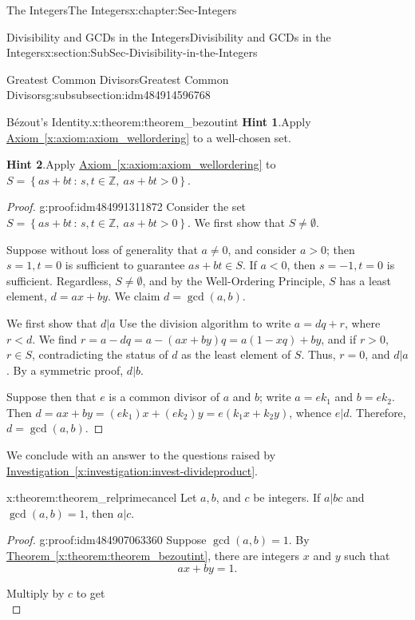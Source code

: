 \documentclass[oneside,10pt,]{book}
\newcommand{\blocktitlefont}{\relax}
\newcommand{\xreffont}{\relax}
\numberwithin{equation}{section}
\newcommand{\setof}[2]{{\left\{#1\,\colon\,#2\right\}}}
\def\Z{{\mathbb Z}}
\newcommand{\lt}{<}
\newcommand{\gt}{>}
\begin{document}
\begin{chapterptx}{The Integers}{}{The Integers}{}{}{x:chapter:Sec-Integers}
\begin{sectionptx}{Divisibility and GCDs in the Integers}{}{Divisibility and GCDs in the Integers}{}{}{x:section:SubSec-Divisibility-in-the-Integers}
\begin{subsubsectionptx}{Greatest Common Divisors}{}{Greatest Common Divisors}{}{}{g:subsubsection:idm484914596768}
\begin{theorem}{Bézout's Identity.}{}{x:theorem:theorem_bezoutint}
\textbf{\blocktitlefont Hint 1}.\quad{}Apply \hyperref[x:axiom:axiom_wellordering]{Axiom~{\xreffont\ref{x:axiom:axiom_wellordering}}} to a well-chosen set.%
\par\smallskip%
\noindent
\textbf{\blocktitlefont Hint 2}.\quad{}Apply \hyperref[x:axiom:axiom_wellordering]{Axiom~{\xreffont\ref{x:axiom:axiom_wellordering}}} to \(S = \setof{as+bt}{s,t\in\Z, \ as+bt \gt 0}\).%
\end{theorem}
\begin{proof}{}{g:proof:idm484991311872}
Consider the set \(S = \setof{as+bt}{s,t\in\Z, \ as+bt \gt 0}\). We first show that \(S\ne \emptyset\).%
\par
Suppose without loss of generality that \(a\ne 0\), and consider \(a \gt 0\); then \(s=1, t = 0\) is sufficient to guarantee \(as+bt\in S\). If \(a \lt 0\), then \(s = -1, t= 0\) is sufficient. Regardless, \(S\ne \emptyset\), and by the Well-Ordering Principle, \(S\) has a least element, \(d = ax+by\). We claim \(d = \gcd(a,b)\).%
\par
We first show that \(d|a\) Use the division algorithm to write \(a = dq + r\), where \(r \lt d\). We find \(r = a - dq = a - (ax+by)q = a(1-xq) + by\), and if \(r\gt 0\), \(r\in S\), contradicting the status of \(d\) as the least element of \(S\). Thus, \(r = 0\), and \(d|a\). By a symmetric proof, \(d|b\).%
\par
Suppose then that \(e\) is a common divisor of \(a\) and \(b\); write \(a = e k_1\) and \(b = e k_2\). Then \(d = ax + by = (ek_1)x + (ek_2)y = e(k_1x + k_2 y)\), whence \(e|d\). Therefore, \(d = \gcd(a,b)\).%
\end{proof}
We conclude with an answer to the questions raised by \hyperref[x:investigation:invest-divideproduct]{Investigation~{\xreffont\ref{x:investigation:invest-divideproduct}}}.%
\begin{theorem}{}{}{x:theorem:theorem_relprimecancel}%
Let \(a, b\), and \(c\) be integers. If \(a|bc\) and \(\gcd(a,b) = 1\), then \(a|c\).%
\end{theorem}
\begin{proof}{}{g:proof:idm484907063360}
Suppose \(\gcd(a,b) = 1\). By \hyperref[x:theorem:theorem_bezoutint]{Theorem~{\xreffont\ref{x:theorem:theorem_bezoutint}}}, there are integers \(x\) and \(y\) such that%
\begin{equation*}
ax+by = 1\text{.}
\end{equation*}
%
\par
Multiply by \(c\) to get%
\begin{equation*}

\end{equation*}
\end{proof}
\end{subsubsectionptx}
\end{sectionptx}
\end{chapterptx}
\end{document}
